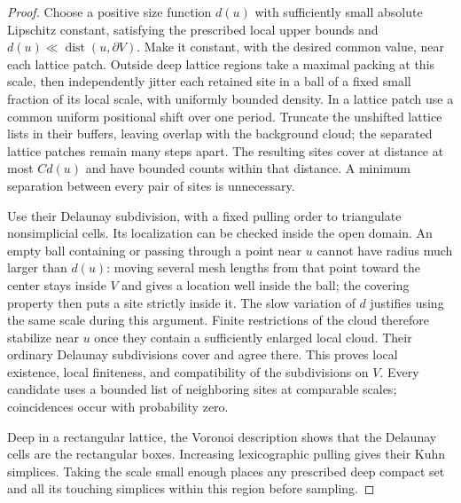 \documentclass[11pt]{article}
\numberwithin{equation}{section}
\theoremstyle{definition}
\theoremstyle{remark}
\begin{document}
\begin{proof}
Choose a positive size function $d(u)$ with sufficiently small absolute
Lipschitz constant, satisfying the prescribed local upper bounds and
$d(u)\ll\operatorname{dist}(u,\partial V)$.  Make it constant, with the desired
common value, near each lattice patch.  Outside deep lattice regions
take a maximal packing at this scale, then independently jitter each
retained site in a ball of a fixed small fraction of its local scale,
with uniformly bounded density.  In a lattice patch use a common
uniform positional shift over one period.  Truncate the unshifted
lattice lists in their buffers, leaving overlap with the background
cloud; the separated lattice patches remain many steps apart.
The resulting sites cover at distance at most $Cd(u)$ and have
bounded counts within that distance.  A minimum separation between
every pair of sites is unnecessary.

Use their Delaunay subdivision, with a fixed pulling order to
triangulate nonsimplicial cells.  Its localization can be checked
inside the open domain.  An empty ball containing or passing through
a point near $u$ cannot have radius much larger than $d(u)$: moving
several mesh lengths from that point toward the center stays inside
$V$ and gives a location well inside the ball; the covering property
then puts a site strictly inside it.  The slow variation of $d$
justifies using the same scale during this argument.  Finite
restrictions of the cloud therefore stabilize near $u$ once they
contain a sufficiently enlarged local cloud.  Their ordinary Delaunay
subdivisions cover and agree there.  This proves local existence,
local finiteness, and compatibility of the subdivisions on $V$.
Every candidate uses a bounded list of neighboring sites at comparable
scales; coincidences occur with probability zero.

Deep in a rectangular lattice, the Voronoi description shows that the
Delaunay cells are the rectangular boxes.  Increasing lexicographic
pulling gives their Kuhn simplices.  Taking the scale small enough
places any prescribed deep compact set and all its touching simplices
within this region before sampling.


\end{proof}
\end{document}
